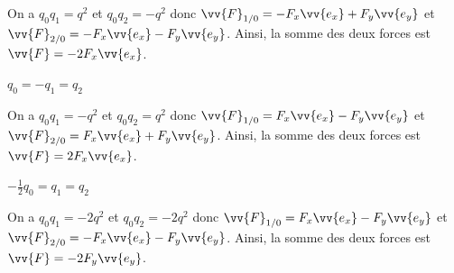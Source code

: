 
\begin{corrigeNewpage}
	On a $q_0q_1 = q^2$ et $q_0q_2 = -q^2$ donc $\vv{F}_{1/0} = -F_x \vv{e_x} + F_y \vv{e_y}$ et $\vv{F}_{2/0} = -F_x \vv{e_x} - F_y \vv{e_y}$. Ainsi, la somme des deux forces est $\vv{F} = -2F_x \vv{e_x}$.
\end{corrigeNewpage}




\begin{enonce}
	$q_0 = -q_1 = q_2$
\end{enonce}


\begin{corrige}
	On a $q_0q_1 = -q^2$ et $q_0q_2 = q^2$ donc $\vv{F}_{1/0} = F_x \vv{e_x} - F_y \vv{e_y}$ et $\vv{F}_{2/0} = F_x \vv{e_x} + F_y \vv{e_y}$. Ainsi, la somme des deux forces est $\vv{F} = 2F_x \vv{e_x}$.
\end{corrige}




\begin{enonce}
	$-\frac{1}{2}q_0 = q_1 = q_2$
\end{enonce}


\begin{corrige}
	On a $q_0q_1 = -2q^2$ et $q_0q_2 = -2q^2$ donc $\vv{F}_{1/0} = F_x \vv{e_x} - F_y \vv{e_y}$ et $\vv{F}_{2/0} = -F_x \vv{e_x} - F_y \vv{e_y}$. Ainsi, la somme des deux forces est $\vv{F} = -2F_y \vv{e_y}$.
\end{corrige}


\finEntrainement








